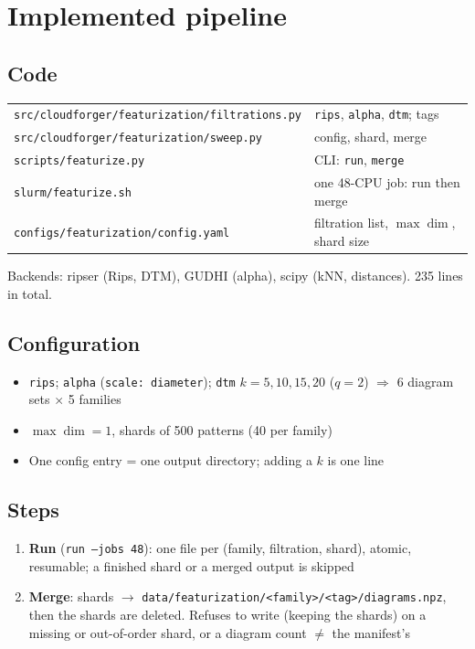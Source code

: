 \documentclass[11pt]{article}
\begin{document}
\section{Implemented pipeline}

\subsection*{Code}
\begin{tabular}{@{}ll@{}}
\toprule
\texttt{src/cloudforger/featurization/filtrations.py} & \texttt{rips}, \texttt{alpha}, \texttt{dtm}; tags \\
\texttt{src/cloudforger/featurization/sweep.py}       & config, shard, merge \\
\texttt{scripts/featurize.py}                          & CLI: \texttt{run}, \texttt{merge} \\
\texttt{slurm/featurize.sh}                            & one 48-CPU job: run then merge \\
\texttt{configs/featurization/config.yaml}             & filtration list, $\max\dim$, shard size \\
\bottomrule
\end{tabular}

\smallskip
Backends: ripser (Rips, DTM), GUDHI (alpha), scipy (kNN, distances). 235 lines in total.

\subsection*{Configuration}
\begin{itemize}
  \item \texttt{rips}; \texttt{alpha} (\texttt{scale: diameter}); \texttt{dtm} $k = 5, 10, 15, 20$ ($q=2$) $\Rightarrow$ 6 diagram sets $\times$ 5 families
  \item $\max\dim = 1$, shards of 500 patterns (40 per family)
  \item One config entry = one output directory; adding a $k$ is one line
\end{itemize}

\subsection*{Steps}
\begin{enumerate}
  \item \textbf{Run} (\texttt{run --jobs 48}): one file per (family, filtration, shard), atomic, resumable; a finished shard or a merged output is skipped
  \item \textbf{Merge}: shards $\to$ \texttt{data/featurization/<family>/<tag>/diagrams.npz}, then the shards are deleted. Refuses to write (keeping the shards) on a missing or out-of-order shard, or a diagram count $\ne$ the manifest's
\end{enumerate}
\end{document}
